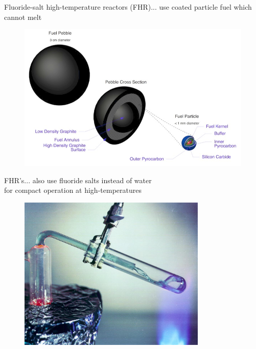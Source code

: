 \documentclass{beamer}
\begin{document}
        \begin{frame}{Fluoride-salt high-temperature reactors (FHR)}{... use coated particle fuel which cannot melt}
            \begin{figure}
                \centering
                \includegraphics[width=1.0\textwidth]{./img/fhrPebble.png}
                \caption*{}
            \end{figure}
        \end{frame}

        \begin{frame}{FHR's}{... also use fluoride salts instead of water \\ for compact operation at high-temperatures}
            \begin{figure}
                \centering
                \includegraphics[width=0.8\textwidth]{./img/fhrFlibe.png}
                \caption*{}
            \end{figure}
        \end{frame}
\end{document}

